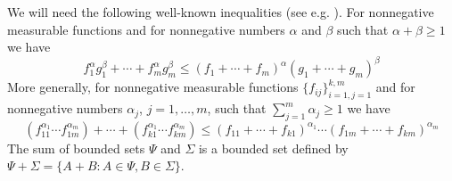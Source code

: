 \documentclass[12pt, reqno]{amsart}
\theoremstyle{definition}
\theoremstyle{remark}
\numberwithin{equation}{section}
\newcommand{\be}{\begin{equation}}
\newcommand{\ee}{\end{equation}}
\begin{document}
We will need the following well-known inequalities (see e.g. \cite{Mi}). For
nonnegative measurable functions and for nonnegative numbers $\alpha$ and $\beta$  such that $\alpha+\beta \ge 1$ we have
\be
f_1^{\alpha}g_1^{\beta}+\cdots+f_m^{\alpha}g_m^{\beta} \le (f_1+\cdots+f_m)^{\alpha}(g_1+\cdots+g_m)^{\beta}
\label{mitrn} %
\ee
More generally, for nonnegative measurable functions $\{f _{i j}\}_{i=1, j=1}^{k, m}$ and for nonnegative numbers  $\alpha_j$, $j=1, \ldots , m$,   such that $\sum _{j=1} ^m \alpha _j \ge 1$ we have
\be
(f_{11}^{\alpha _1} \cdots f_{1m}^{\alpha _m})+\cdots+(f_{k1}^{\alpha _1} \cdots f_{km}^{\alpha _m}) \le (f_{11}+\cdots+f_{k1})^{\alpha _1} \cdots (f_{1m}+\cdots+f_{km})^{\alpha _m}
\label{mitr2}
\ee
The sum of bounded sets $\Psi$ and $\Sigma$ is a bounded set defined by
$\Psi + \Sigma =\{A+B: A \in \Psi, B \in \Sigma\}$.
\end{document}
